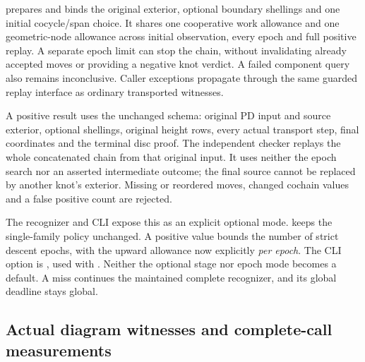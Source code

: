  prepares and binds the original exterior,
optional boundary shellings and one initial cocycle/span choice. It shares
one cooperative work allowance and one geometric-node allowance across
initial observation, every epoch and full positive replay. A separate epoch
limit can stop the chain, without invalidating already accepted moves or
providing a negative knot verdict. A failed component query also remains
inconclusive. Caller exceptions propagate through the same guarded replay
interface as ordinary transported witnesses.

A positive result uses the unchanged 
schema: original PD input and source exterior, optional shellings, original
height rows, every actual transport step, final coordinates and the terminal
disc proof. The independent checker replays the whole concatenated chain
from that original input. It uses neither the epoch search nor an asserted
intermediate outcome; the final source cannot be replaced by another knot's
exterior. Missing or reordered moves, changed cochain values and a false
positive count are rejected.

The recognizer and CLI expose this as an explicit optional mode.
 keeps the single-family policy unchanged.
A positive value bounds the number of strict descent epochs, with the
upward allowance now explicitly \emph{per epoch}. The CLI option is
, used with . Neither the
optional stage nor epoch mode becomes a default. A miss continues the
maintained complete recognizer, and its global deadline stays global.

\subsection{Actual diagram witnesses and complete-call measurements}

